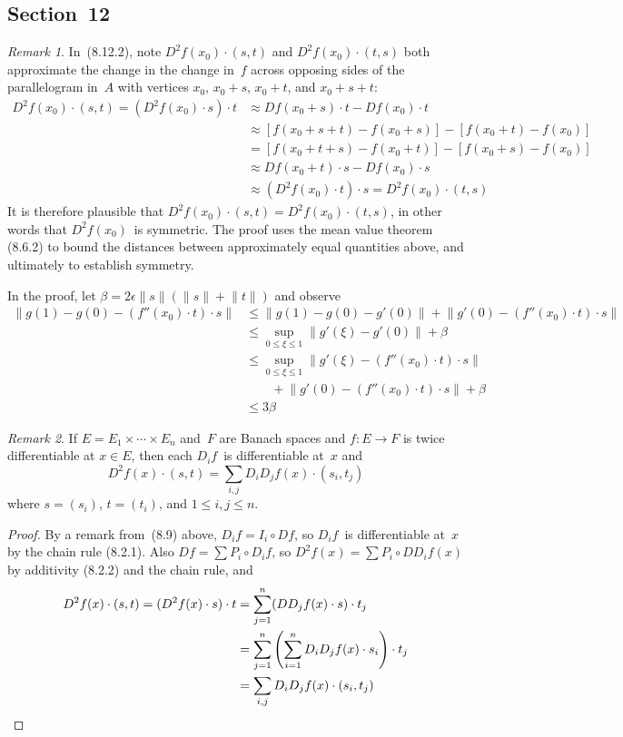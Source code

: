 \documentclass[letterpaper,12pt]{article}
\newcommand{\after}{\circ}
\newcommand{\at}{\cdot}
\newcommand{\norm}[1]{\lVert{#1}\rVert}
\theoremstyle{plain}
\theoremstyle{definition}
\theoremstyle{remark}
\newtheorem*{rmk}{Remark}
\begin{document}
\subsection*{Section~12}
\begin{rmk}
In~(8.12.2), note \(D^2f(x_0)\at(s,t)\) and \(D^2f(x_0)\at(t,s)\) both approximate the change in the change in~\(f\) across opposing sides of the parallelogram in~\(A\) with vertices \(x_0\), \(x_0+s\), \(x_0+t\), and \(x_0+s+t\):
\begin{align*}
D^2f(x_0)\at(s,t)=(D^2f(x_0)\at s)\at t&\approx Df(x_0+s)\at t-Df(x_0)\at t\\
	&\approx[f(x_0+s+t)-f(x_0+s)]-[f(x_0+t)-f(x_0)]\\
	&=[f(x_0+t+s)-f(x_0+t)]-[f(x_0+s)-f(x_0)]\\
	&\approx Df(x_0+t)\at s-Df(x_0)\at s\\
	&\approx(D^2f(x_0)\at t)\at s=D^2f(x_0)\at(t,s)
\end{align*}
It is therefore plausible that \(D^2f(x_0)\at(s,t)=D^2f(x_0)\at(t,s)\), in other words that \(D^2f(x_0)\)~is symmetric. The proof uses the mean value theorem (8.6.2) to bound the distances between approximately equal quantities above, and ultimately to establish symmetry.

In the proof, let \(\beta=2\epsilon\norm{s}(\norm{s}+\norm{t})\) and observe
\begin{align*}
\norm{g(1)-g(0)-(f''(x_0)\at t)\at s}&\le\norm{g(1)-g(0)-g'(0)}+\norm{g'(0)-(f''(x_0)\at t)\at s}\\
	&\le\sup_{0\le\xi\le 1}\norm{g'(\xi)-g'(0)}+\beta\\
	&\le\sup_{0\le\xi\le 1}\norm{g'(\xi)-(f''(x_0)\at t)\at s}\\
	&\qquad+\norm{g'(0)-(f''(x_0)\at t)\at s}+\beta\\
	&\le3\beta
\end{align*}
\end{rmk}

\begin{rmk}
If \(E=E_1\times\cdots\times E_n\) and~\(F\) are Banach spaces and \(f:E\to F\) is twice differentiable at \(x\in E\), then each \(D_i f\)~is differentiable at~\(x\) and
\[D^2f(x)\at(s,t)=\sum_{i,j}D_iD_jf(x)\at(s_i,t_j)\]
where \(s=(s_i)\), \(t=(t_i)\), and \(1\le i,j\le n\).
\end{rmk}
\begin{proof}
By a remark from~(8.9) above, \(D_if=I_i\after Df\), so \(D_if\)~is differentiable at~\(x\) by the chain rule (8.2.1). Also \(Df=\sum P_i\after D_if\), so \(D^2f(x)=\sum P_i\after DD_if(x)\) by additivity (8.2.2) and the chain rule, and
\begin{align*}
D^2f(x)\at(s,t)=(D^2f(x)\at s)\at t&=\sum_{j=1}^n(DD_jf(x)\at s)\at t_j\\
	&=\sum_{j=1}^n\left(\sum_{i=1}^nD_iD_jf(x)\at s_i\right)\at t_j\\
	&=\sum_{i,j}D_iD_jf(x)\at(s_i,t_j)\qedhere
\end{align*}
\end{proof}
\end{document}
